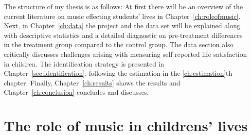 \documentclass[a4, 12pt]{article}
\begin{document}
The structure of my thesis is as follows: At first there will be an overview of the current literature on music effecting students' lives in Chapter~\ref{ch:roleofmusic}. Next, in Chapter~\ref{ch:data} the project and the data set will be explained along with descriptive statistics and a detailed diagnostic on pre-treatment differences in the treatment group compared to the control group. The data section also critically discusses challenges arising with measuring self reported life satisfaction in children. The identification strategy is presented in Chapter~\ref{sec:identification}, following the estimation in the \ref{ch:estimation}th chapter. Finally, Chapter~\ref{ch:results} shows the results and Chapter~\ref{ch:conclusion} concludes and discusses.

\hypertarget{the-role-of-music-in-childrens-lives}{%
\section{The role of music in childrens' lives}\label{the-role-of-music-in-childrens-lives}}
\end{document}
